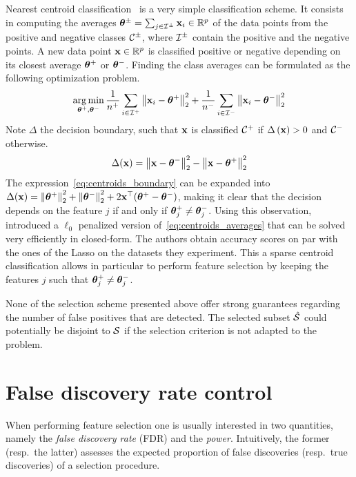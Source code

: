 Nearest centroid classification~\citep{centroid_classification} is a very simple classification scheme.
It consists in computing the averages $\bm{\theta}^\pm = \sum_{j \in \mathcal{I}^\pm} \mathbf{x}_i \in \mathbb{R}^p$
of the data points from the positive and negative classes $\mathcal{C}^\pm$,
where $\mathcal{I}^\pm$ contain the positive and the negative points.
A new data point $\mathbf{x} \in \mathbb{R}^p$ is classified positive or negative depending on its closest average
$\bm{\theta}^+$ or $\bm{\theta}^-$.
Finding the class averages can be formulated as the following optimization problem.
\begin{equation}\label{eq:centroids_averages}
    \operatorname*{arg\,min}_{\bm{\theta}^+, \bm{\theta}^-}
        \frac{1}{n^+} \sum_{i \in \mathcal{I}^+} \big\lVert \mathbf{x}_i - \bm{\theta}^+ \big\rVert^2_2
        + \frac{1}{n^-} \sum_{i \in \mathcal{I}^-} \big\lVert \mathbf{x}_i - \bm{\theta}^- \big\rVert^2_2
\end{equation}
Note $\Delta$ the decision boundary,
such that $\mathbf{x}$ is classified $\mathcal{C}^+$ if $\Delta\left( \mathbf{x} \right) > 0$ and $\mathcal{C}^-$ otherwise.
\begin{equation}\label{eq:centroids_boundary}
    \Delta(\mathbf{x}) = \left\lVert\mathbf{x} - \bm{\theta}^-\right\rVert^2_2 - \left\lVert\mathbf{x} - \bm{\theta}^+\right\rVert^2_2
\end{equation}
The expression~\ref{eq:centroids_boundary} can be expanded into
$\Delta(\mathbf{x}) = \left\lVert\bm{\theta}^+\right\rVert^2_2 + \left\lVert\bm{\theta}^-\right\rVert^2_2 + 2\mathbf{x}^\top(\bm{\theta}^+ - \bm{\theta}^-)$,
making it clear that the decision depends on the feature $j$ if and only if $\bm{\theta}^+_j \neq \bm{\theta}^-_j$.
Using this observation,\cite{sparse_center_classifiers} introduced a $\ell_0$ penalized version
of~\ref{eq:centroids_averages} that can be solved very efficiently in closed-form.
The authors obtain accuracy scores on par with the ones of the Lasso on the datasets they experiment.
This a sparse centroid classification allows in particular to perform feature selection
by keeping the features $j$ such that $\bm{\theta}^+_j \neq \bm{\theta}^-_j$.

\bigbreak
None of the selection scheme presented above offer strong guarantees regarding
the number of false positives that are detected.
The selected subset $\hat{\mathcal{S}}$ could potentially be disjoint to $\mathcal{S}$
if the selection criterion is not adapted to the problem.

\section{False discovery rate control}\label{sec:fdrc}

When performing feature selection one is usually interested in two quantities,
namely the \emph{false discovery rate} (FDR) and the \emph{power}.
Intuitively, the former (resp.\ the latter) assesses the expected proportion of false discoveries
(resp.\ true discoveries) of a selection procedure.

